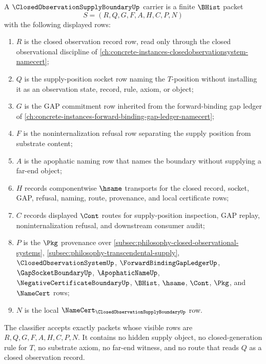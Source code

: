 \begin{definition}
\label{def:closed-observation-supply-boundary-carrier}
A $\ClosedObservationSupplyBoundaryUp$ carrier is a finite $\BHist$ packet
$$
S=(R,Q,G,F,A,H,C,P,N)
$$
with the following displayed rows:
\begin{enumerate}
\item $R$ is the closed observation record row, read only through the closed observational discipline of \autoref{ch:concrete-instances-closedobservationsystem-namecert};
\item $Q$ is the supply-position socket row naming the $T$-position without installing it as an observation state, record, rule, axiom, or object;
\item $G$ is the GAP commitment row inherited from the forward-binding gap ledger of \autoref{ch:concrete-instances-forward-binding-gap-ledger-namecert};
\item $F$ is the noninternalization refusal row separating the supply position from substrate content;
\item $A$ is the apophatic naming row that names the boundary without supplying a far-end object;
\item $H$ records componentwise $\hsame$ transports for the closed record, socket, GAP, refusal, naming, route, provenance, and local certificate rows;
\item $C$ records displayed $\Cont$ routes for supply-position inspection, GAP replay, noninternalization refusal, and downstream consumer audit;
\item $P$ is the $\Pkg$ provenance over \autoref{subsec:philosophy-closed-observational-systems}, \autoref{subsec:philosophy-transcendental-supply}, $\ClosedObservationSystemUp$, $\ForwardBindingGapLedgerUp$, $\GapSocketBoundaryUp$, $\ApophaticNameUp$, $\NegativeCertificateBoundaryUp$, $\BHist$, $\hsame$, $\Cont$, $\Pkg$, and $\NameCert$ rows;
\item $N$ is the local $\NameCert_{\ClosedObservationSupplyBoundaryUp}$ row.
\end{enumerate}
The classifier accepts exactly packets whose visible rows are $R,Q,G,F,A,H,C,P,N$. It contains no hidden supply object, no closed-generation rule for $T$, no substrate axiom, no far-end witness, and no route that reads $Q$ as a closed observation record.
\end{definition}

